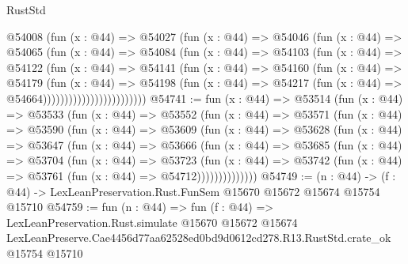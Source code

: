 \begin{lexlean}{RustStd}
\begin{coremodule}
                          @54008
                            (fun (x : @44) =>
                            @54027
                              (fun (x : @44) =>
                              @54046
                                (fun (x : @44) =>
                                @54065
                                  (fun (x : @44) =>
                                  @54084
                                    (fun (x : @44) =>
                                    @54103
                                      (fun (x : @44) =>
                                      @54122
                                        (fun (x : @44) =>
                                        @54141
                                          (fun (x : @44) =>
                                          @54160
                                            (fun (x : @44) =>
                                            @54179
                                              (fun (x : @44) =>
                                              @54198
                                                (fun (x : @44) =>
                                                @54217
                                                  (fun (x : @44) => @54664))))))))))))))))))))))))
@54741 := fun (x : @44) =>
  @53514
    (fun (x : @44) =>
    @53533
      (fun (x : @44) =>
      @53552
        (fun (x : @44) =>
        @53571
          (fun (x : @44) =>
          @53590
            (fun (x : @44) =>
            @53609
              (fun (x : @44) =>
              @53628
                (fun (x : @44) =>
                @53647
                  (fun (x : @44) =>
                  @53666
                    (fun (x : @44) =>
                    @53685
                      (fun (x : @44) =>
                      @53704
                        (fun (x : @44) =>
                        @53723
                          (fun (x : @44) =>
                          @53742 (fun (x : @44) => @53761 (fun (x : @44) => @54712))))))))))))))
@54749 := (n : @44) ->
  (f : @44) -> LexLeanPreservation.Rust.FunSem @15670 @15672 @15674 @15754 @15710
@54759 := fun (n : @44) =>
  fun (f : @44) =>
  LexLeanPreservation.Rust.simulate
    @15670
    @15672
    @15674
    LexLeanPreserve.Cae4456d77aa62528ed0bd9d0612cd278.R13.RustStd.crate_ok
    @15754
    @15710
\end{coremodule}
\end{lexlean}
